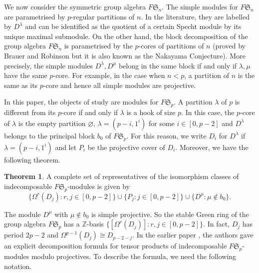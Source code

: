 \documentclass[12pt,reqno]{amsart}
\newcommand{\Z}{\mathbb{Z}}
\newcommand{\sym}[1]{\mathfrak{S}_{#1}}
\newcommand{\F}{{F}}
\newcommand{\block}{b}
\theoremstyle{definition}
\newtheorem{thm}{Theorem}[section]
\numberwithin{equation}{section}
\begin{document}
We now consider the symmetric group algebra $\F\sym{n}$. The simple modules for $\F\sym{n}$ are parametrised by $p$-regular partitions of $n$. In the literature, they are labelled by $D^\lambda$ and can be identified as the quotient of a certain Specht module by its unique maximal submodule. On the other hand, the block decomposition of the group algebra $\F\sym{n}$ is parametrised by the $p$-cores of partitions of $n$ (proved by Brauer and Robinson \cite{Brauer:1947,robinsonproof} but it is also known as the Nakayama Conjecture). More precisely, the simple modules $D^\lambda,D^\mu$ belong in the same block if and only if $\lambda,\mu$ have the same $p$-core. For example, in the case when $n<p$, a partition of $n$ is the same as its $p$-core and hence all simple modules are projective. 

In this paper, the objects of study are modules for $\F\sym{p}$. A partition $\lambda$ of $p$ is different from its $p$-core if and only if $\lambda$ is a hook of size $p$. In this case, the $p$-core of $\lambda$ is the empty partition $\varnothing$, $\lambda=(p-i,1^i)$ for some $i\in [0,p-2]$ and $D^\lambda$ belongs to the principal block $\block_0$ of $\F\sym{p}$. For this reason, we write $D_i$ for $D^\lambda$ if $\lambda=(p-i,1^i)$ and let $P_i$ be the projective cover of $D_i$. Moreover, we have the following theorem. 

\begin{thm}
  A complete set of representatives of the isomorphism classes of indecomposable $\F\sym{p}$-modules is given by \[\{\Omega^r(D_j):r,j\in[0,p-2]\}\cup \{P_j:j\in [0,p-2]\}\cup \{D^\mu:\mu\not\in \block_0\}.\]
\end{thm}

The module $D^\mu$ with $\mu\not\in \block_0$ is simple projective. So the stable Green ring of the group algebra $\F\sym{p}$ has a $\Z$-basis $\{[\Omega^r(D_j)]:r,j\in[0,p-2]\}$. In fact, $D_j$ has period $2p-2$ and $\Omega^{p-1}(D_j)\cong D_{p-2-j}$. In the earlier paper \cite{kualim1}, the authors gave an explicit decomposition formula for tensor products of indecomposable $\F\sym{p}$-modules modulo projectives. To describe the formula, we need the following notation.
\end{document}

